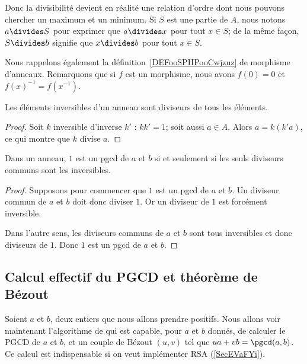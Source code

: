 Donc la divisibilité devient en réalité une relation d'ordre dont nous pouvons chercher un maximum et un minimum. Si \( S\) est une partie de \( A\), nous notons \( a\divides S\) pour exprimer que \( a\divides x\) pour tout \( x\in S\); de la même façon, \( S\divides b\) signifie que \( x\divides b\) pour tout \( x\in S\).

Nous rappelons également la définition~\ref{DEFooSPHPooCwjzuz} de morphisme d'anneaux. Remarquons que si \( f\) est un morphisme, nous avons \( f(0)=0\) et \( f(x)^{-1}=f(x^{-1})\).

\begin{lemma}
	Les éléments inversibles d'un anneau sont diviseurs de tous les éléments.
\end{lemma}

\begin{proof}
	Soit \( k\) inversible d'inverse \( k'\) : \( kk'=1\); soit aussi \( a\in A\). Alors \( a=k(k'a)\), ce qui montre que \( k\) divise \( a\).
\end{proof}

\begin{lemma}
	Dans un anneau, \( 1\) est un pgcd de \( a\) et \( b\) si et seulement si les seuls diviseurs communs sont les inversibles.
\end{lemma}

\begin{proof}
	Supposons pour commencer que \( 1\) est un pgcd de \( a\) et \( b\). Un diviseur commun de \( a\) et \( b\) doit donc diviser \( 1\). Or un diviseur de \( 1\) est forcément inversible.

	Dans l'autre sens, les diviseurs communs de \( a\) et \( b\) sont tous inversibles et donc diviseurs de \( 1\). Donc \( 1\) est un pgcd de \( a\) et \( b\).
\end{proof}

\subsection{Calcul effectif du PGCD et théorème de Bézout}
\label{subSecIpmnhO}

Soient \( a\) et \( b\), deux entiers que nous allons prendre positifs. Nous allons voir maintenant l'algorithme de  qui est capable, pour \( a\) et \( b\) donnés, de calculer le PGCD de \( a\) et \( b\), et un couple de Bézout \( (u,v)\) tel que \( ua+vb=\pgcd(a,b)\). Ce calcul est indispensable si on veut implémenter RSA (\ref{SecEVaFYi}).

